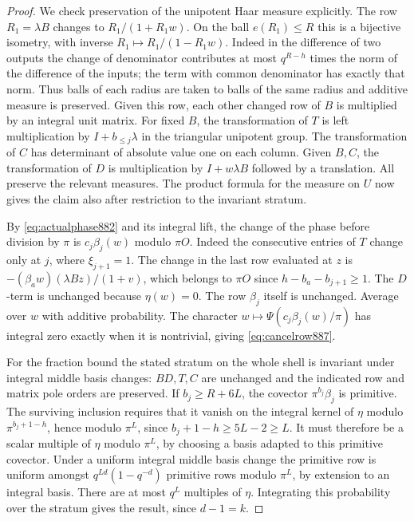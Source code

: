 \documentclass[a4paper,11pt]{article}
\theoremstyle{definition}
\theoremstyle{remark}
\numberwithin{equation}{section}
\begin{document}
\begin{proof}
We check preservation of the unipotent Haar measure explicitly.
The row \(R_1=\lambda B\) changes to \(R_1/(1+R_1w)\). On the
ball \(e(R_1)\le R\) this is a bijective isometry, with inverse
\(R_1\mapsto R_1/(1-R_1w)\). Indeed in the difference of two
outputs the change of denominator contributes at most
\(q^{R-h}\) times the norm of the difference of the inputs;
the term with common denominator has exactly that norm. Thus
balls of each radius are taken to balls of the same radius
and additive measure is preserved. Given this row, each other
changed row of \(B\) is multiplied by an integral unit matrix.
For fixed \(B\), the transformation of \(T\) is left
multiplication by \(I+b_{\le j}\lambda\) in the triangular
unipotent group. The transformation of \(C\) has determinant
of absolute value one on each column. Given \(B,C\), the
transformation of \(D\) is multiplication by \(I+w\lambda B\)
followed by a translation. All preserve the relevant measures.
The product formula for the measure on \(U\) now gives the claim
also after restriction to the invariant stratum.

By \eqref{eq:actualphase882} and its integral lift, the change of
the phase before division by \(\pi\) is \(c_j\beta_j(w)\) modulo
\(\pi O\). Indeed the consecutive entries of \(T\) change only
at \(j\), where \(\xi_{j+1}=1\). The change in the last row evaluated
at \(z\) is \(-(\beta_a w)(\lambda Bz)/(1+v)\), which belongs
to \(\pi O\) since \(h-b_a-b_{j+1}\ge1\). The \(D\)-term is
unchanged because \(\eta(w)=0\). The row \(\beta_j\) itself
is unchanged. Average over \(w\) with additive probability.
The character \(w\mapsto\Psi(c_j\beta_j(w)/\pi)\) has integral
zero exactly when it is nontrivial, giving \eqref{eq:cancelrow887}.

For the fraction bound the stated stratum on the whole shell
is invariant under integral middle basis changes: \(BD,T,C\)
are unchanged and the indicated row and matrix pole orders
are preserved. If \(b_j\ge R+6L\), the covector
\(\pi^{b_j}\beta_j\) is primitive. The surviving inclusion
requires that it vanish on the integral kernel of \(\eta\)
modulo \(\pi^{b_j+1-h}\), hence modulo \(\pi^L\), since
\(b_j+1-h\ge5L-2\ge L\). It must therefore be a scalar multiple
of \(\eta\) modulo \(\pi^L\), by choosing a basis adapted to
this primitive covector. Under a uniform integral middle basis
change the primitive row is uniform amongst
\(q^{Ld}(1-q^{-d})\) primitive rows modulo \(\pi^L\), by extension
to an integral basis. There are at most \(q^L\) multiples of
\(\eta\). Integrating this probability over the stratum gives
the result, since \(d-1=k\).
\end{proof}
\end{document}
